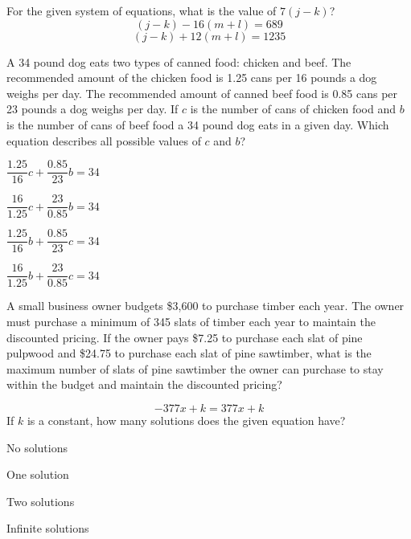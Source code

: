 \vfill
\noindent\begin{minipage}{\linewidth}
\par\smallskip
For the given system of equations, what is the value of $7(j-k)$? $$(j-k)-16(m+l)=689$$ $$(j-k)+12(m+l)=1235$$
\end{minipage}
\vfill
\noindent\begin{minipage}{\linewidth}
\par\smallskip
A 34 pound dog eats two types of canned food: chicken and beef. The recommended amount of the chicken food is 1.25 cans per 16 pounds a dog weighs per day. The recommended amount of canned beef food is 0.85 cans per 23 pounds a dog weighs per day. If $c$ is the number of cans of chicken food and $b$ is the number of cans of beef food a 34 pound dog eats in a given day. Which equation describes all possible values of $c$ and $b$?
\begin{satchoices}
  \item[A)] $\dfrac{1.25}{16}c+\dfrac{0.85}{23}b=34$
  \item[B)] $\dfrac{16}{1.25}c+\dfrac{23}{0.85}b=34$
  \item[C)] $\dfrac{1.25}{16}b+\dfrac{0.85}{23}c=34$
  \item[D)] $\dfrac{16}{1.25}b+\dfrac{23}{0.85}c=34$
\end{satchoices}
\end{minipage}
\vfill
\clearpage
\noindent\begin{minipage}{\linewidth}
\par\smallskip
A small business owner budgets \$3,600 to purchase timber each year. The owner must purchase a minimum of 345 slats of timber each year to maintain the discounted pricing. If the owner pays \$7.25 to purchase each slat of pine pulpwood and \$24.75 to purchase each slat of pine sawtimber, what is the maximum number of slats of pine sawtimber the owner can purchase to stay within the budget and maintain the discounted pricing?
\end{minipage}
\vfill
\noindent\begin{minipage}{\linewidth}
\par\smallskip
$$-377x+k=377x+k$$ If $k$ is a constant, how many solutions does the given equation have?
\begin{satchoices}
  \item[A)] No solutions
  \item[B)] One solution
  \item[C)] Two solutions
  \item[D)] Infinite solutions
\end{satchoices}
\end{minipage}
